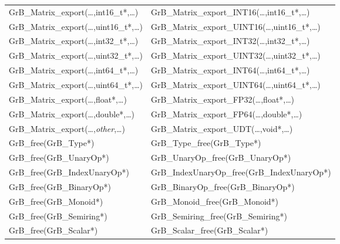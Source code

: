 \begin{table}[htb]
{\begin{tabular}{l|l}
{\sf GrB\_Matrix\_export(\ldots,int16\_t*,\ldots)}		& {\sf GrB\_Matrix\_export\_INT16(\ldots,int16\_t*,\ldots)} \\
{\sf GrB\_Matrix\_export(\ldots,uint16\_t*,\ldots)}		& {\sf GrB\_Matrix\_export\_UINT16(\ldots,uint16\_t*,\ldots)} \\
{\sf GrB\_Matrix\_export(\ldots,int32\_t*,\ldots)}		& {\sf GrB\_Matrix\_export\_INT32(\ldots,int32\_t*,\ldots)} \\
{\sf GrB\_Matrix\_export(\ldots,uint32\_t*,\ldots)}		& {\sf GrB\_Matrix\_export\_UINT32(\ldots,uint32\_t*,\ldots)} \\
{\sf GrB\_Matrix\_export(\ldots,int64\_t*,\ldots)}		& {\sf GrB\_Matrix\_export\_INT64(\ldots,int64\_t*,\ldots)} \\
{\sf GrB\_Matrix\_export(\ldots,uint64\_t*,\ldots)}		& {\sf GrB\_Matrix\_export\_UINT64(\ldots,uint64\_t*,\ldots)} \\
{\sf GrB\_Matrix\_export(\ldots,float*,\ldots)}			& {\sf GrB\_Matrix\_export\_FP32(\ldots,float*,\ldots)} \\
{\sf GrB\_Matrix\_export(\ldots,double*,\ldots)}		& {\sf GrB\_Matrix\_export\_FP64(\ldots,double*,\ldots)} \\
{\sf GrB\_Matrix\_export(\ldots,\emph{other},\ldots)}	& {\sf GrB\_Matrix\_export\_UDT(\ldots,void*,\ldots)} \\
\hline
{\sf GrB\_free(GrB\_Type*)}					& {\sf GrB\_Type\_free(GrB\_Type*)} \\
{\sf GrB\_free(GrB\_UnaryOp*)}					& {\sf GrB\_UnaryOp\_free(GrB\_UnaryOp*)} \\
{\sf GrB\_free(GrB\_IndexUnaryOp*)}				& {\sf GrB\_IndexUnaryOp\_free(GrB\_IndexUnaryOp*)} \\
{\sf GrB\_free(GrB\_BinaryOp*)}					& {\sf GrB\_BinaryOp\_free(GrB\_BinaryOp*)} \\
{\sf GrB\_free(GrB\_Monoid*)}					& {\sf GrB\_Monoid\_free(GrB\_Monoid*)} \\
{\sf GrB\_free(GrB\_Semiring*)}					& {\sf GrB\_Semiring\_free(GrB\_Semiring*)} \\
{\sf GrB\_free(GrB\_Scalar*)}					& {\sf GrB\_Scalar\_free(GrB\_Scalar*)} \\


\end{tabular}}
\end{table}
